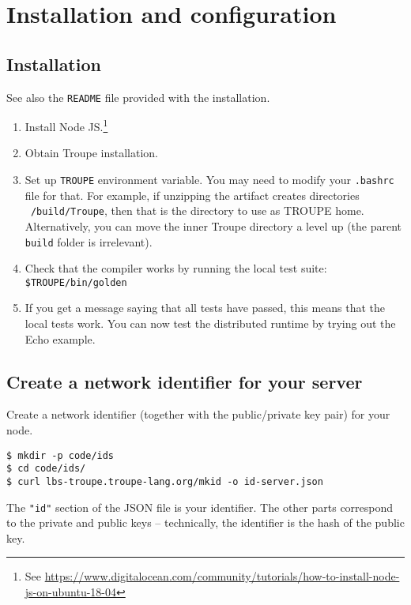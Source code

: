\section{Installation and configuration}
\label{appendix:installationandconfig}
\subsection{Installation}
See also the {\tt README} file provided with the installation.
\begin{enumerate}
    \item Install Node JS.\footnote{
    See \url{https://www.digitalocean.com/community/tutorials/how-to-install-node-js-on-ubuntu-18-04}}
    \item Obtain Troupe installation.
    \item Set up {\tt TROUPE} environment variable. You may need to modify your {\tt .bashrc} file for that. For example, if unzipping the artifact creates directories {\tt ~/build/Troupe}, then that is the directory to use as TROUPE home. Alternatively, you can move the inner Troupe directory a level up (the parent {\tt build} folder is irrelevant).
    \item Check that the compiler works by running the local test suite: {\tt \$TROUPE/bin/golden}
    \item If you get a message saying that all tests have passed, this means that the local tests work. You can now test the distributed runtime by trying out the Echo example.
\end{enumerate}

\subsection{Create a network identifier for your server}
\label{sec:networkid}
Create a network identifier (together with the public/private key pair) for your node. 
\begin{verbatim}
$ mkdir -p code/ids
$ cd code/ids/
$ curl lbs-troupe.troupe-lang.org/mkid -o id-server.json
\end{verbatim}

The {\tt "id"} section of the JSON file is your identifier. The other 
parts correspond to the private and public keys -- technically,
the identifier is the hash of the public key.


